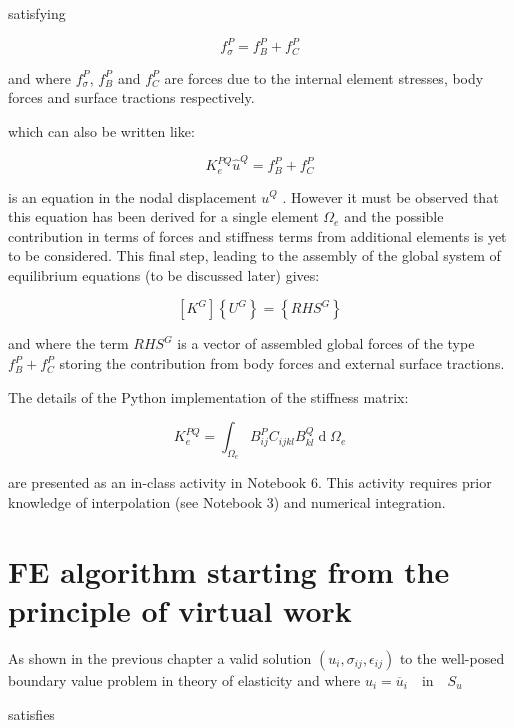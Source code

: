 satisfying


\begin{equation}
f_\sigma^P=f_B^P+f_C^P
\label{nodal_forces}
\end{equation}


and where $f_\sigma^P$, $f_B^P$ and $f_C^P$ are forces due to the internal element stresses, body forces and surface tractions respectively.

 which can also be written like:

\[K_e^{PQ}\widehat u^Q =f_B^P+f_C^P\]

is an equation in the nodal displacement $u^Q$ . However it must be observed that this equation has been derived for a single element $\Omega_e$ and the possible contribution in terms of forces and stiffness terms from additional elements is yet to be considered. This final step, leading to the assembly of the global system of equilibrium equations (to be discussed later) gives:


\begin{equation}
\left[K^G\right]\left\{U^G\right\}=\left\{RHS^G\right\}
\label{globalsys}
\end{equation}

and where the term $RHS^G$ is a vector of assembled global forces of the type $f_B^P+f_C^P$ storing the contribution from body forces and external surface tractions.

\begin{tcolorbox}
The details of the Python implementation of the stiffness matrix:

\[K_e^{PQ}=\int_{\Omega_e}B_{ij}^PC_{ijkl}B_{kl}^Q\operatorname d\Omega_e\]

are presented as an in-class activity in Notebook 6. This activity requires prior knowledge of interpolation (see Notebook 3) and numerical integration.

\end{tcolorbox}

\section{FE algorithm starting from the principle of virtual work}

As shown in the previous chapter a valid solution $(u_i , \sigma_{ij} , \epsilon_{ij})$ to the well-posed boundary value problem in theory of elasticity and where $u_i={\overline u}_i \quad \text{in} \quad  S_u$

satisfies 

